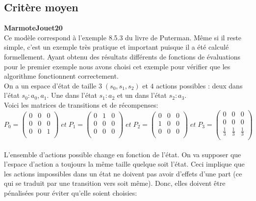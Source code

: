 \documentclass{article}
\begin{document}
\subsection{Critère moyen}
\textbf{MarmoteJouet20}\\
Ce modèle correspond à l’exemple 8.5.3 du livre de Puterman. Même si il reste simple, c'est un exemple très pratique et important puisque il a été calculé formellement. Ayant obtenu des résultats différents de fonctions de évaluations pour le premier exemple nous avons choisi cet exemple pour vérifier que les algorithme fonctionnent correctement.\\
On a un espace d’état de taille $3 \; (s_0, s_1, s_2)$ et $4$ actions possibles : deux dans l’état $s_0 :
a_0, a_1$. Une dans l’état $s_1 : a_2$ et un dans l’état $s_2 : a_3$.\\
Voici les matrices de transitions et de récompenses:\\

$$ P_0 = \begin{pmatrix}
0 & 0 & 0 \\
0 & 0 & 0 \\
0 & 0 & 1 \\
\end{pmatrix} \; et \; P_1 = \begin{pmatrix}
0 & 1 & 0 \\
0 & 0 & 0 \\
0 & 0 & 0 \\
\end{pmatrix} \; et \; P_2 = \begin{pmatrix}
0 & 0 & 0 \\
1 & 0 & 0 \\
0 & 0 & 0 \\    
\end{pmatrix} \; et \;P_3 = \begin{pmatrix}
0 & 0 & 0 \\
0 & 0 & 0 \\
\frac{1}{3} & \frac{1}{3} & \frac{1}{3} \\
\end{pmatrix}$$ \\
L’ensemble d’actions possible change en fonction de l’état. On va supposer
que l’espace d’action a toujours la même taille quelque soit l’état. Ceci implique que les
actions impossibles dans un état ne doivent pas avoir d’effets d’une part (ce qui se traduit
par une transition vers soit même). Donc, elles doivent être pénalisées pour éviter
qu’elle soient choisies:
\end{document}

